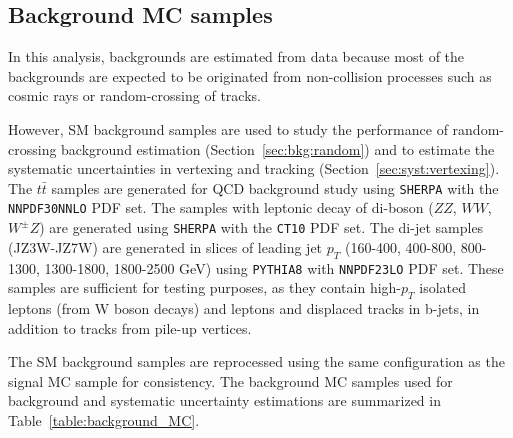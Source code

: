 \subsection{Background MC samples}
\label{sec:background_mc_sample}
In this analysis, backgrounds are estimated from data because most of the backgrounds are expected to be originated from non-collision processes such as cosmic rays or random-crossing of tracks. %

However, SM background samples are used to study the performance of random-crossing background estimation (Section~\ref{sec:bkg:random}) and to estimate the systematic uncertainties in vertexing and tracking (Section~\ref{sec:syst:vertexing}). The $t\bar{t}$ samples are generated for QCD background study using \texttt{SHERPA} with the \texttt{NNPDF30NNLO} PDF set. The samples with leptonic decay of di-boson ($ZZ$, $WW$, $W^{\pm}Z$) are generated using \texttt{SHERPA} with the \texttt{CT10} PDF set. The di-jet samples (JZ3W-JZ7W) are generated in slices of leading jet $p_{T}$ (160-400, 400-800, 800-1300, 1300-1800, 1800-2500 GeV) using \texttt{PYTHIA8} with \texttt{NNPDF23LO} PDF set. These samples are sufficient for testing purposes, as they contain high-$p_{T}$ isolated leptons (from W boson decays) and leptons and displaced tracks in b-jets, in addition to tracks from pile-up vertices. 

The SM background samples are reprocessed using the same configuration as the signal MC sample for consistency. The background MC samples used for background and systematic uncertainty estimations are summarized in Table~\ref{table:background_MC}.



